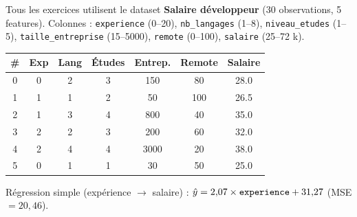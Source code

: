 %






\setlength{\parskip}{3pt}
\setlength{\abovedisplayskip}{6pt}
\setlength{\belowdisplayskip}{6pt}

\begin{tcolorbox}[
    enhanced, colback=ipssiCyan!5, colframe=ipssiCyan!50,
    boxrule=0.8pt, arc=4pt, title={\sffamily\bfseries Rappel --- Dataset fil rouge},
    coltitle=white, colbacktitle=ipssiCyan!70,
]
\small
Tous les exercices utilisent le dataset \textbf{Salaire d\'{e}veloppeur} (30 observations, 5 features).
Colonnes : \texttt{experience} (0--20), \texttt{nb\_langages} (1--8), \texttt{niveau\_etudes} (1--5),
\texttt{taille\_entreprise} (15--5000), \texttt{remote} (0--100), \texttt{salaire} (25--72 k\texteuro).

\medskip
\begin{center}
\renewcommand{\arraystretch}{1.1}
\begin{tabular}{c|ccccc|c}
    \toprule
    \textbf{\#} & \textbf{Exp} & \textbf{Lang} & \textbf{\'{E}tudes} & \textbf{Entrep.} & \textbf{Remote} & \textbf{Salaire} \\
    \midrule
    0  & 0  & 2 & 3 & 150  & 80  & 28.0 \\
    1  & 1  & 1 & 2 & 50   & 100 & 26.5 \\
    2  & 1  & 3 & 4 & 800  & 40  & 35.0 \\
    3  & 2  & 2 & 3 & 200  & 60  & 32.0 \\
    4  & 2  & 4 & 4 & 3000 & 20  & 38.0 \\
    5  & 0  & 1 & 1 & 30   & 50  & 25.0 \\
    \bottomrule
\end{tabular}
\end{center}

R\'{e}gression simple (exp\'{e}rience $\to$ salaire) :
$\hat{y} = 2{,}07 \times \texttt{experience} + 31{,}27$ \quad (MSE $= 20{,}46$).
\end{tcolorbox}

